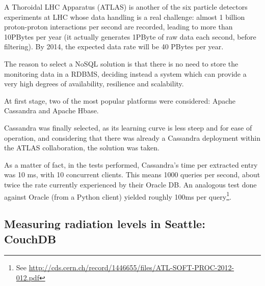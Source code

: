 A Thoroidal LHC Apparatus (ATLAS) is another of the six particle detectors experiments
at LHC %
whose data handling is a real challenge: almost 1 billion
proton-proton
interactions per second
are recorded,
leading to more than 10PBytes per year (it actually generates 1PByte of raw data each second, before filtering). By 2014, the expected data rate will be 40 PBytes per year.


The reason to select a NoSQL solution is
that
there is no need to store the monitoring data in a RDBMS, deciding instead a system which can provide a very high degrees of availability, resilience and scalability.

At first stage, two of the most popular platforms were considered: Apache
Cassandra
and Apache Hbase.

Cassandra was finally selected, as its learning curve is less steep %
and for ease of operation,
and considering that
there was %
already
a Cassandra deployment within the ATLAS collaboration,
the solution was taken.

As a matter of fact, in the tests
performed, %
Cassandra's time per extracted entry was 10 ms, with 10 concurrent clients. This means 1000 queries per second, about twice the rate currently experienced by their Oracle DB. An analogous test done against Oracle (from a Python client) yielded roughly 100ms per
query\footnote{See \url{http://cds.cern.ch/record/1446655/files/ATL-SOFT-PROC-2012-012.pdf}}.


\subsection{Measuring radiation levels in Seattle: CouchDB} %
\label{sec:measuring_radiation_levels_in_seattle_couchdb}

